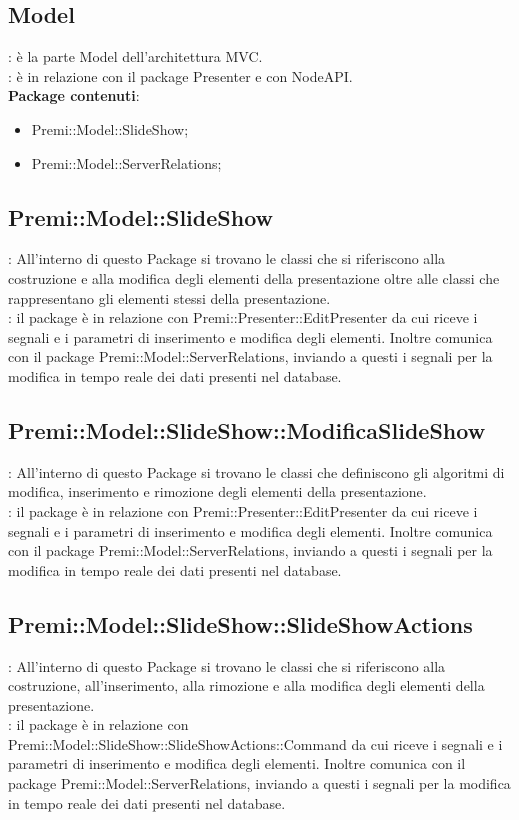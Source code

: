 \subsection{Model}{
	\textbf{\tipo}: è la parte Model dell'architettura MVC.\\
	\textbf{\relaz}: è in relazione con il package Presenter e con NodeAPI.\\
	\textbf{Package contenuti}: 
	\begin{itemize}
	\item Premi::Model::SlideShow;
    \item Premi::Model::ServerRelations;
	\end{itemize}
}
\subsection{Premi::Model::SlideShow}{
		\textbf{\tipo}: All’interno di questo Package si trovano le classi che si riferiscono alla costruzione e alla modifica degli elementi della presentazione oltre alle classi che rappresentano gli elementi stessi della presentazione.\\
        \textbf{\relaz}: il package è in relazione con Premi::Presenter::EditPresenter da cui riceve i segnali e i parametri di inserimento e modifica degli elementi. Inoltre comunica con il package Premi::Model::ServerRelations, inviando a questi i segnali per la modifica in tempo reale dei dati presenti nel database.\\
    }
\subsection{Premi::Model::SlideShow::ModificaSlideShow}{
		\textbf{\tipo}: All’interno di questo Package si trovano le classi che definiscono gli algoritmi di modifica, inserimento e rimozione degli elementi della presentazione.\\
        \textbf{\relaz}: il package è in relazione con Premi::Presenter::EditPresenter da cui riceve i segnali e i parametri di inserimento e modifica degli elementi. Inoltre comunica con il package Premi::Model::ServerRelations, inviando a questi i segnali per la modifica in tempo reale dei dati presenti nel database.\\
    }
\subsection{Premi::Model::SlideShow::SlideShowActions}{
		\textbf{\tipo}: All’interno di questo Package si trovano le classi che si riferiscono alla costruzione, all'inserimento, alla rimozione e alla modifica degli elementi della presentazione.\\
        \textbf{\relaz}: il package è in relazione con Premi::Model::SlideShow::SlideShowActions::Command da cui riceve i segnali e i parametri di inserimento e modifica degli elementi. Inoltre comunica con il package Premi::Model::ServerRelations, inviando a questi i segnali per la modifica in tempo reale dei dati presenti nel database.\\
    }
    
